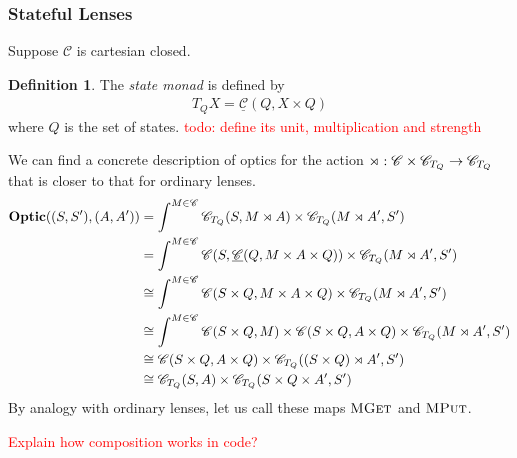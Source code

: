 \documentclass[11pt,letterpaper]{article}
\theoremstyle{plain}
\theoremstyle{definition}
\newtheorem{definition}[theorem]{Definition}
\newcommand{\C}{\mathscr{C}}
\newcommand{\homC}{\underline{\C}}
\newcommand{\Optic}{\mathbf{Optic}}
\newcommand{\mget}{\textsc{MGet}}
\newcommand{\mput}{\textsc{MPut}}
\newcommand{\todo}[1]{\textcolor{red}{\small #1}}
\begin{document}
\subsubsection{Stateful Lenses}

Suppose $\C$ is cartesian closed.

\begin{definition}
The \emph{state monad} is defined by
\begin{align*}
T_Q X = \homC(Q, X \times Q)
\end{align*}
where $Q$ is the set of states.
\todo{todo: define its unit, multiplication and strength}
\end{definition}

We can find a concrete description of optics for the action $\monact : \C \times \C_{T_Q} \to \C_{T_Q}$ that is closer to that for ordinary lenses.
\begin{align*}
\Optic((S, S'), (A, A'))
&= \int^{M \in \C} \C_{T_Q}(S, M \monact A) \times \C_{T_Q}(M \monact A', S') \\
&= \int^{M \in \C} \C(S, \homC(Q, M \times A \times Q)) \times \C_{T_Q}(M \monact A', S') \\
&\cong \int^{M \in \C} \C(S \times Q, M \times A\times Q) \times \C_{T_Q}(M \monact A', S') \\
&\cong \int^{M \in \C} \C(S \times Q, M) \times \C(S \times Q, A\times Q) \times \C_{T_Q}(M \monact A', S') \\
&\cong \C(S \times Q, A \times Q) \times \C_{T_Q}((S \times Q) \monact A', S') \\
&\cong \C_{T_Q}(S, A) \times \C_{T_Q}(S \times Q \times A', S')
\end{align*}
By analogy with ordinary lenses, let us call these maps $\mget$ and $\mput$.

\todo{Explain how composition works in code?}
\end{document}
